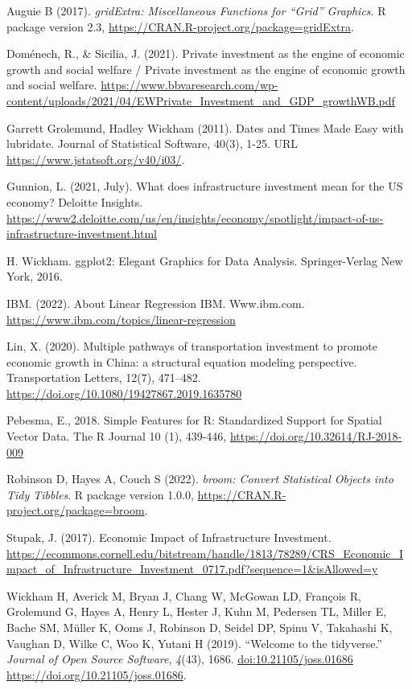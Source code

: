 \documentclass[
]{article}
\begin{document}
Auguie B (2017). \emph{gridExtra: Miscellaneous Functions for ``Grid'' Graphics}. R package
version 2.3, \url{https://CRAN.R-project.org/package=gridExtra}.

Doménech, R., \& Sicilia, J. (2021). Private investment as the engine of economic growth and social welfare / Private investment as the engine of economic growth and social welfare. \url{https://www.bbvaresearch.com/wp-content/uploads/2021/04/EWPrivate_Investment_and_GDP_growthWB.pdf}

Garrett Grolemund, Hadley Wickham (2011). Dates and Times Made Easy with lubridate.
Journal of Statistical Software, 40(3), 1-25. URL \url{https://www.jstatsoft.org/v40/i03/}.

Gunnion, L. (2021, July). What does infrastructure investment mean for the US economy? Deloitte Insights. \url{https://www2.deloitte.com/us/en/insights/economy/spotlight/impact-of-us-infrastructure-investment.html}

H. Wickham. ggplot2: Elegant Graphics for Data Analysis. Springer-Verlag New York, 2016.

IBM. (2022). About Linear Regression \textbar{} IBM. Www.ibm.com. \url{https://www.ibm.com/topics/linear-regression}

Lin, X. (2020). Multiple pathways of transportation investment to promote economic growth in China: a structural equation modeling perspective. Transportation Letters, 12(7), 471--482. \url{https://doi.org/10.1080/19427867.2019.1635780}

Pebesma, E., 2018. Simple Features for R: Standardized Support for Spatial Vector Data.
The R Journal 10 (1), 439-446, \url{https://doi.org/10.32614/RJ-2018-009}

Robinson D, Hayes A, Couch S (2022). \emph{broom: Convert Statistical Objects into Tidy
Tibbles}. R package version 1.0.0, \url{https://CRAN.R-project.org/package=broom}.

Stupak, J. (2017). Economic Impact of Infrastructure Investment. \url{https://ecommons.cornell.edu/bitstream/handle/1813/78289/CRS_Economic_Impact_of_Infrastructure_Investment_0717.pdf?sequence=1\&isAllowed=y}

Wickham H, Averick M, Bryan J, Chang W, McGowan LD, François R, Grolemund G, Hayes A,
Henry L, Hester J, Kuhn M, Pedersen TL, Miller E, Bache SM, Müller K, Ooms J, Robinson
D, Seidel DP, Spinu V, Takahashi K, Vaughan D, Wilke C, Woo K, Yutani H (2019). ``Welcome
to the tidyverse.'' \emph{Journal of Open Source Software}, \emph{4}(43), 1686.
\url{doi:10.21105/joss.01686} \url{https://doi.org/10.21105/joss.01686}.
\end{document}
